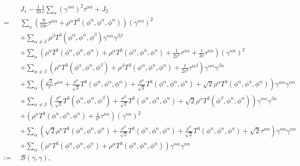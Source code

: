 \documentclass[12pt]{article}
\numberwithin{equation}{section}
\theoremstyle{plain}
\theoremstyle{definition}
\theoremstyle{remark}
\begin{document}
\begin{equation}
\begin{split}
  \,\,\,&  J_1 - \frac{1}{10} \frac{1}{v}  \sum_{\alpha} (\gamma^{\alpha \alpha})^2 \tau^{\alpha \alpha} +J_2 \\
  = \,\,\,&  \sum_{\alpha} \left( \frac{9}{10v}  \tau^{\alpha \alpha} + \rho^{\alpha} T^3 (\phi^{\alpha}, \phi^{\alpha}, \phi^{\alpha}) \right)   (\gamma^{\alpha \alpha})^2  \\
  & + \sum_{\alpha \neq \beta}  \rho^{\beta} T^3 (\phi^{\alpha}, \phi^{\alpha}, \phi^{\beta})    \gamma^{\alpha \alpha} \gamma^{\beta \beta} \\
  & + \sum_{\alpha}    \left( \rho^n T^3 (\phi^{\alpha}, \phi^{n}, \phi^{\alpha}) + \rho^{\alpha} T^3 (\phi^{\alpha}, \phi^n, \phi^n) + \frac{1}{2v^3} \tau^{\alpha \alpha} +  \frac{1}{2v} \tau^{nn} \right) (\gamma^{\alpha n})^2 \\
  & + \sum_{\alpha \neq \beta}  \left( \rho^n  T^3 (\phi^{\alpha}, \phi^{n}, \phi^{\beta}) + \rho^{\beta} T^3 (\phi^{\alpha}, \phi^n, \phi^n) + \frac{1}{2v^3}  \tau^{\alpha \beta}  \right)  \gamma^{\alpha n} \gamma^{\beta n} \\
  & + \sum_{\alpha}  \left( \frac{\sqrt{2}}{v}  \tau^{\alpha n}  + \frac{\rho^n}{\sqrt{2}}  T^3 (\phi^{\alpha}, \phi^{\alpha}, \phi^{\alpha}) + \frac{\rho^{\alpha}}{\sqrt{2}} T^3 (\phi^{\alpha}, \phi^{\alpha}, \phi^{n}) + \sqrt{2} \rho^{\alpha}  T^3 (\phi^{\alpha}, \phi^{n}, \phi^{\alpha}) \right) \gamma^{\alpha \alpha} \gamma^{\alpha n} \\
  & + \sum_{\alpha \neq \beta}  \left( \frac{\rho^n}{\sqrt{2}}  T^3 (\phi^{\alpha}, \phi^{\alpha}, \phi^{\beta}) + \frac{\rho^{\beta}}{\sqrt{2}} T^3 (\phi^{\alpha}, \phi^{\alpha}, \phi^{n}) +  \sqrt{2} \rho^{\alpha}  T^3 (\phi^{\beta}, \phi^{n}, \phi^{\alpha})  \right) \gamma^{\alpha \alpha} \gamma^{\beta n} \\
  & + \left( \rho^n  T^3 (\phi^{n}, \phi^{n}, \phi^{n})  + \frac{1}{v^3}  \tau^{n n}  \right)  (\gamma^{n n})^2 \\
  & + \sum_{\alpha} \left( \sqrt{2}  \rho^n  T^3 (\phi^{\alpha}, \phi^n, \phi^n) + \frac{\rho^n}{\sqrt{2}} T^3 (\phi^{n}, \phi^{n}, \phi^{\alpha}) +  \frac{\rho^{\alpha}}{\sqrt{2}} T^3 (\phi^{n}, \phi^{n}, \phi^{n}) + \sqrt{2} \tau^{\alpha n}  \right) \gamma^{\alpha n} \gamma^{n n}  \\
  & + \sum_{\alpha} \left(  \rho^n  T^3 (\phi^{\alpha}, \phi^{\alpha}, \phi^{n}) + \rho^{\alpha} T^3 (\phi^{n}, \phi^{n}, \phi^{\alpha})   \right) \gamma^{\alpha \alpha} \gamma^{n n} \\
  :=\,\,\, & \mathcal{B}(\gamma, \gamma),
\end{split}
\end{equation}
\end{document}
